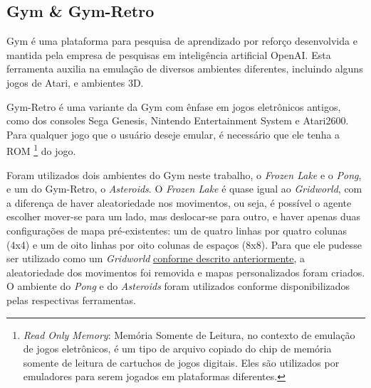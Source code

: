 \subsection{Gym \& Gym-Retro}
\label{sec:gymretro}

Gym é uma plataforma para pesquisa de aprendizado por reforço desenvolvida e mantida pela empresa de pesquisas em inteligência artificial OpenAI.
Esta ferramenta auxilia na emulação de diversos ambientes diferentes, incluindo alguns jogos de Atari,  e ambientes 3D.

Gym-Retro é uma variante da Gym com ênfase em jogos eletrônicos antigos, como dos consoles Sega Genesis, Nintendo Entertainment System e Atari2600.
Para qualquer jogo que o usuário deseje emular, é necessário que ele tenha a ROM \footnote{\textit{Read Only Memory}: Memória Somente de Leitura, no contexto de emulação de jogos eletrônicos, é um tipo de arquivo copiado do chip de memória somente de leitura de cartuchos de jogos digitais. Eles são utilizados por emuladores para serem jogados em plataformas diferentes.} do jogo.

Foram utilizados dois ambientes do Gym neste trabalho, o \textit{Frozen Lake} e o \textit{Pong}, e um do Gym-Retro, o \textit{Asteroids}.
O \textit{Frozen Lake} é quase igual ao \textit{Gridworld}, com a diferença de haver aleatoriedade nos movimentos, ou seja, é possível o agente escolher mover-se para um lado, mas deslocar-se para outro, e haver apenas duas configurações de mapa pré-existentes: um de quatro linhas por quatro colunas (4x4) e um de oito linhas por oito colunas de espaços (8x8).
Para que ele pudesse ser utilizado como um \textit{Gridworld} \hyperref[sec:gridworld]{conforme descrito anteriormente}, a aleatoriedade dos movimentos foi removida e mapas personalizados foram criados.
O ambiente do \textit{Pong} e do \textit{Asteroids} foram utilizados conforme disponibilizados pelas respectivas ferramentas.


